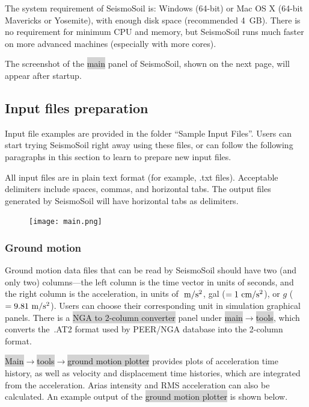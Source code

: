 \documentclass[11pt,letterpaper]{article}
\newcommand{\panel}[1]{\colorbox{lightgray}{\textsf{#1}}}
\begin{document}
The system requirement of SeismoSoil is: Windows (64-bit) or Mac OS X (64-bit Mavericks or Yosemite), with enough disk space (recommended 4~GB). There is no requirement for minimum CPU and memory, but SeismoSoil runs much faster on more advanced machines (especially with more cores).

The screenshot of the \panel{main} panel of SeismoSoil, shown on the next page, will appear after startup.

\subsection{Input files preparation}

Input file examples are provided in the folder ``Sample Input Files''. Users can start trying SeismoSoil right away using these files, or can follow the following paragraphs in this section to learn to prepare new input files.

All input files are in plain text format (for example, \textsf{.txt} files). Acceptable delimiters include spaces, commas, and horizontal tabs. The output files generated by SeismoSoil will have horizontal tabs as delimiters.

\begin{figure}[H]
\centering
  \texttt{[image: main.png]}\\
\end{figure}

\newpage
\subsubsection{Ground motion}\label{sec:motion_file}

Ground motion data files that can be read by SeismoSoil should have two (and only two) columns---the left column is the time vector in units of seconds, and the right column is the acceleration, in units of $~\mathrm{m/s^2}$, gal ($=1~\mathrm{cm/s^2}$), or $g$ ($=9.81~\mathrm{m/s^2}$). Users can choose their corresponding unit in simulation graphical panels. There is a \panel{NGA to 2-column converter} panel under \panel{main}$\rightarrow$\panel{tools}, which converts the~\textsf{.AT2} format used by PEER/NGA database into the 2-column format.

\panel{Main}$\rightarrow$\panel{tools}$\rightarrow$\panel{ground motion plotter} provides plots of acceleration time history, as well as velocity and displacement time histories, which are integrated from the acceleration. Arias intensity and RMS acceleration can also be calculated. An example output of the \panel{ground motion plotter} is shown below.
\end{document}

